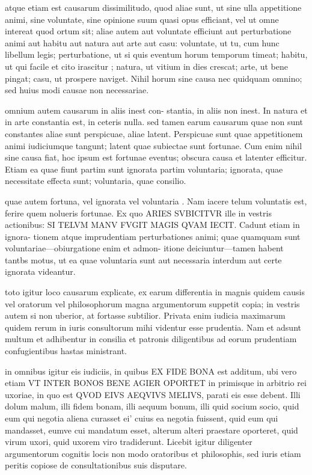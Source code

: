  atque etiam est causarum dissimilitudo, quod aliae sunt, ut sine ulla appetitione animi, sine voluntate, sine opinione suum quasi opus efficiant, vel ut omne intereat quod ortum sit; aliae autem aut voluntate efficiunt aut perturbatione animi aut habitu aut natura aut arte aut casu: voluntate, ut tu, cum hunc libellum legis; perturbatione, ut si quis eventum horum temporum timeat; habitu, ut qui facile et cito irascitur ; natura, ut vitium in dies crescat; arte, ut bene pingat; casu, ut prospere naviget. Nihil horum sine causa nec quidquam omnino; sed huius modi causae non necessariae.

 omnium autem causarum in aliis inest con- stantia, in aliis non inest. In natura et in arte constantia est, in ceteris nulla. sed tamen earum causarum quae non sunt constantes aliae sunt perspicuae, aliae latent. Perspicuae sunt quae appetitionem animi iudiciumque tangunt; latent quae subiectae sunt fortunae. Cum enim nihil sine causa fiat, hoc ipsum est fortunae eventus; obscura causa et latenter efficitur. Etiam ea quae fiunt partim sunt ignorata partim voluntaria; ignorata, quae necessitate effecta sunt; voluntaria, quae consilio.

 quae autem fortuna, vel ignorata vel voluntaria . Nam iacere telum voluntatis est, ferire quem nolueris fortunae. Ex quo ARIES SVBICITVR ille in vestris actionibus: SI TELVM MANV FVGIT MAGIS QVAM IECIT. Cadunt etiam in ignora- tionem atque imprudentiam perturbationes animi; quae quamquam sunt voluntariae—obiurgatione enim et admon- itione deiciuntur—tamen habent tantbs motus, ut ea quae voluntaria sunt aut necessaria interdum aut certe ignorata videantur.

 toto igitur loco causarum explicate, ex earum differentia in magnis quidem causis vel oratorum vel philosophorum magna argumentorum suppetit copia; in vestris autem si non uberior, at fortasse subtilior. Privata enim iudicia maximarum quidem rerum in iuris consultorum mihi videntur esse prudentia. Nam et adsunt multum et adhibentur in consilia et patronis diligentibus ad eorum prudentiam confugientibus hastas ministrant.

 in omnibus igitur eis iudiciis, in quibus EX FIDE BONA est additum, ubi vero etiam VT INTER BONOS BENE AGIER OPORTET in primisque in arbitrio rei uxoriae, in quo est QVOD EIVS AEQVIVS MELIVS, parati eis esse debent. Illi dolum malum, illi fidem bonam, illi aequum bonum, illi quid socium socio, quid eum qui negotia aliena curasset ei' cuius ea negotia fuissent, quid eum qui mandasset, eumve cui mandatum esset, alterum alteri praestare oporteret, quid virum uxori, quid uxorem viro tradiderunt. Licebit igitur diligenter argumentorum cognitis locis non modo oratoribus et philosophis, sed iuris etiam peritis copiose de consultationibus suis disputare.

